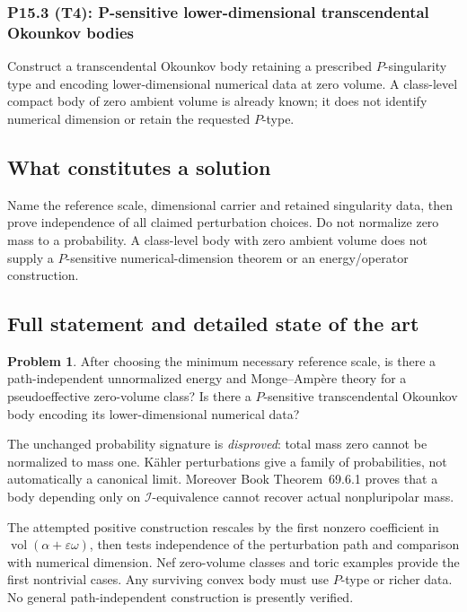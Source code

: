 \documentclass[11pt,a4paper]{article}
\theoremstyle{definition}
\newtheorem{problem}{Problem}[section]
\theoremstyle{remark}
\begin{document}
\subsubsection*{P15.3 (T4): P-sensitive lower-dimensional transcendental Okounkov bodies}
\label{atom:P15.3}
Construct a transcendental Okounkov body retaining a prescribed \(P\)-singularity type and encoding lower-dimensional numerical data at zero volume. A class-level compact body of zero ambient volume is already known; it does not identify numerical dimension or retain the requested \(P\)-type.

\subsection{What constitutes a solution}
Name the reference scale, dimensional carrier and retained singularity data, then prove independence of all claimed perturbation choices. Do not normalize zero mass to a probability. A class-level body with zero ambient volume does not supply a \(P\)-sensitive numerical-dimension theorem or an energy/operator construction.

\subsection{Full statement and detailed state of the art}
\label{sec:ch72-zero-volume}

\begin{problem}\label{prob:frontier-zero-volume}
After choosing the minimum necessary reference scale, is there a
path-independent unnormalized energy and Monge--Ampère theory for a
pseudoeffective zero-volume class?  Is there a \(P\)-sensitive
transcendental Okounkov body encoding its lower-dimensional numerical data?
\end{problem}

The unchanged probability signature is \emph{disproved}: total mass zero
cannot be normalized to mass one.  Kähler perturbations give a family of
probabilities, not automatically a canonical limit.  Moreover
Book Theorem~69.6.1 proves that a body depending only on
\(\mathcal I\)-equivalence cannot recover actual nonpluripolar mass.

The attempted positive construction rescales by the first nonzero coefficient
in \(\operatorname{vol}(\alpha+\varepsilon\omega)\), then tests independence
of the perturbation path and comparison with numerical dimension.  Nef
zero-volume classes and toric examples provide the first nontrivial cases.
Any surviving convex body must use \(P\)-type or richer data.  No general
path-independent construction is presently verified.
\end{document}
